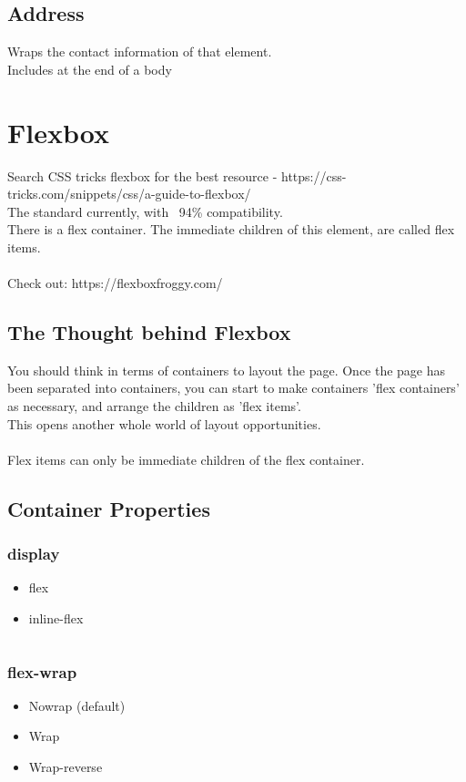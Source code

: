 \documentclass[]{article}
\newcommand{\<}{\guilsinglleft}
\renewcommand{\>}{\guilsinglright}
\begin{document}
\subsection{Address}
Wraps the contact information of that element.
\\
Includes at the end of a body 

\section{Flexbox}
Search CSS tricks flexbox for the best resource - https://css-tricks.com/snippets/css/a-guide-to-flexbox/
\\
The standard currently, with ~94\% compatibility.
\\
There is a flex container.  The immediate children of this element, are called flex items.
\\\\
Check out: https://flexboxfroggy.com/
\subsection{The Thought behind Flexbox}
You should think in terms of containers to layout the page.  Once the page has been separated into containers, you can start to make containers 'flex containers' as necessary, and arrange the children as 'flex items'.  
\\
This opens another whole world of layout opportunities.
\\\\
Flex items can only be immediate children of the flex container.

\subsection{Container Properties}
\subsubsection{display}
\begin{itemize}
	\item flex
	\item inline-flex
\end{itemize}
\begin{lstlisting}
\end{lstlisting}

\subsubsection{flex-wrap}
\begin{itemize}
	\item Nowrap (default)
	\item Wrap
	\item Wrap-reverse
\end{itemize}
\begin{lstlisting}
\end{lstlisting}
\end{document}
